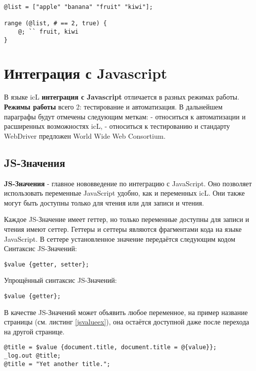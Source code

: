 \documentclass[a4paper, 14pt]{extarticle}
\begin{document}
\begin{lstlisting}[caption=Интервал: от второго до последнего, label=seclastex]
@list = ["apple" "banana" "fruit" "kiwi"];

range (@list, # == 2, true) {
	@; `` fruit, kiwi
}
\end{lstlisting}

\section{Интеграция с Javascript}

В языке icL {\bf интеграция с Javascript} отличается в разных режимах работы. {\bf Режимы работы} всего 2: тестирование и автоматизация. В дальнейшем параграфы будут отмечены следующим меткам: \code{[icL]} - относиться к автоматизации и расширенных возможностях icL, \code{[w3c]} - относиться к тестированию и стандарту WebDriver предложен World Wide Web Consortium.

\subsection{JS-Значения}

{\bf JS-Значения} - главное нововведение по интеграцию с JavaScript. Оно позволяет использовать переменные JavaScript удобно, как и переменных icL. Они также могут быть доступны только для чтения или для записи и чтения.

Каждое JS-Значение имеет геттер, но только переменные доступны для записи и чтения имеют сеттер. Геттеры и сеттеры являются фрагментами кода на языке JavaScript. В сеттере установленное значение передаётся следующим кодом  Синтаксис JS-Значений:
\begin{lstlisting}[numbers=none]
$value {getter, setter};
\end{lstlisting}

Упрощённый синтаксис JS-Значений:
\begin{lstlisting}[numbers=none]
$value {getter};
\end{lstlisting}

В качестве JS-Значений может объявить любое переменное, на пример название страницы (см. листинг \ref{jsvalueex}), она остаётся доступной даже после перехода на другой странице.

\begin{lstlisting}[caption=Использование JS-Значений, label=jsvalueex]
@title = $value {document.title, document.title = @{value}};
_log.out @title;
@title = "Yet another title.";
\end{lstlisting}
\end{document}
